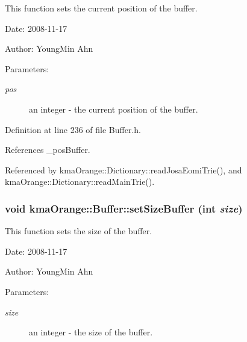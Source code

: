 This function sets the current position of the buffer. 

\begin{Desc}
\item[Date:]2008-11-17 \end{Desc}
\begin{Desc}
\item[Author:]YoungMin Ahn \end{Desc}
\begin{Desc}
\item[Parameters:]
\begin{description}
\item[{\em pos}]an integer - the current position of the buffer. \end{description}
\end{Desc}


Definition at line 236 of file Buffer.h.

References \_\-posBuffer.

Referenced by kmaOrange::Dictionary::readJosaEomiTrie(), and kmaOrange::Dictionary::readMainTrie().\hypertarget{classkmaOrange_1_1Buffer_0d7ee52c85477ab147f8cc741cfcac50}{
\subsubsection[{setSizeBuffer}]{\setlength{\rightskip}{0pt plus 5cm}void kmaOrange::Buffer::setSizeBuffer (int {\em size})}}
\label{classkmaOrange_1_1Buffer_0d7ee52c85477ab147f8cc741cfcac50}


This function sets the size of the buffer. 

\begin{Desc}
\item[Date:]2008-11-17 \end{Desc}
\begin{Desc}
\item[Author:]YoungMin Ahn \end{Desc}
\begin{Desc}
\item[Parameters:]
\begin{description}
\item[{\em size}]an integer - the size of the buffer. \end{description}
\end{Desc}


